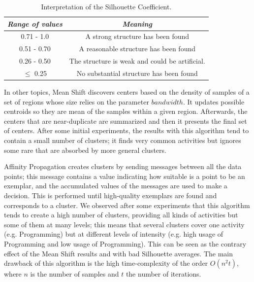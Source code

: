 \begin{table}
	\caption{Interpretation of the Silhouette Coefficient.}
	\label{tbl:silhouette}
	\centering
	\begin{tabular}{c | c }
		\hline 
		\emph{Range of values} & \emph{Meaning}\\  
		\hline 
		\hline
		0.71 - 1.0 & A strong structure has been found\\
		\hline
		0.51 - 0.70 & A reasonable structure has been found\\
		\hline
		0.26 - 0.50 & The structure is weak and could be artificial.  \\
		\hline	
		$\le$ 0.25 & No substantial structure has been found \\
		\hline
		
	\end{tabular}
\end{table}


In other topics, Mean Shift \cite{CM02} discovers centers based on the density of samples of a set of regions whose size relies on the parameter $bandwidth$. It updates possible centroids so they are mean of the samples within a given region. Afterwards, the centers that are near-duplicate are summarized and then it presents the final set of centers. After some initial experiments, the results with this algorithm tend to contain a small number of clusters; it finds very common activities but ignores some rare that are absorbed by more general clusters. %

Affinity Propagation \cite{FD07} creates clusters by sending messages between all the data points; this message contains a value indicating how suitable is a point to be an exemplar, and the accumulated values of the messages are used to make a decision. This is performed until high-quality exemplars are found and corresponds to a cluster. We observed after some experiments that this algorithm tends to create a high number of clusters, providing all kinds of activities but some of them at many levels; this means that several clusters cover one activity (e.g. Programming) but at different levels of intensity (e.g. high usage of Programming and low usage of Programming). This can be seen as the contrary effect of the Mean Shift results and with bad Silhouette averages. The main drawback of this algorithm is the high time-complexity of the order $O(n^2t)$, where $n$ is the number of samples and $t$ the number of iterations.

